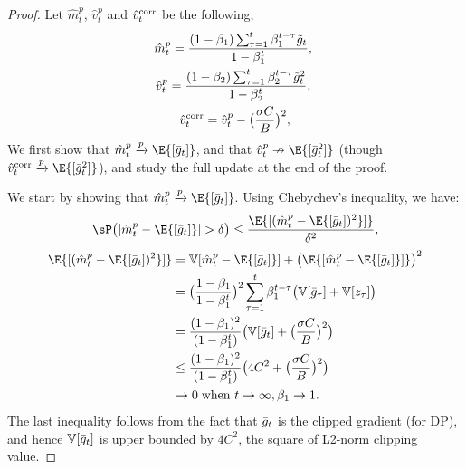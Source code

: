 \documentclass[letterpaper]{article} %
\def\V{\mathbb{V}}
\begin{document}
\begin{proof}
Let $\hat{m}_t^{p}$, $\hat{v}_t^{p}$ and $\hat{v}_t^{\textnormal{corr}}$ be the following,
\begin{gather*}
    \hat{m}_t^{p} = \frac{(1-\beta_1)\sum_{\tau=1}^{t}\beta_1^{t-\tau}\Tilde{g}_t}{1-\beta_1^t}, \; \\
    \hat{v}_t^{p} = \frac{(1-\beta_2)\sum_{\tau=1}^{t}\beta_2^{t-\tau}\Tilde{g}_t^2}{1-\beta_2^t}, \; \\%
    \hat{v}_t^{\textnormal{corr}} = \hat{v}_t^{p} - \big( \frac{\sigma C}{B} \big)^2,
\end{gather*}
We first show that $\hat{m}_t^{p} \xrightarrow{p} \E{[\Bar{g}_t]}$, and that $\hat{v}_t^{p} \nrightarrow \E{[\Bar{g}_t^2]}$ (though $\hat{v}_t^{\textnormal{corr}} \xrightarrow{p} \E{[\Bar{g}_t^2]}$), and study the full update at the end of the proof.

We start by showing that $\hat{m}_t^{p} \xrightarrow{p} \E{[\Bar{g}_t]}$. Using Chebychev's inequality, we have:
\begin{equation*}
    \sP\big( |\hat{m}_t^p - \E{[\Bar{g}_t]}| > \delta \big) \leq \frac{\E{[(\hat{m}_t^p - \E{[\Bar{g}_t])^2}]}}{\delta^2},
\end{equation*}
\begin{align*}
    \E{[(\hat{m}_t^p - \E{[\Bar{g}_t])^2}]} &= \V{[\hat{m}_t^p - \E{[\Bar{g}_t]}]} + \big(\E{[\hat{m}_t^p - \E{[\Bar{g}_t]}]}\big)^2 \\
    &= \big(\frac{1-\beta_1}{1-\beta_1^t}\big)^2 \sum_{\tau=1}^t \beta_1^{t-\tau} \big( \V{[\Bar{g}_\tau]} + \V{[z_\tau]} \big) \\
    &= \frac{(1-\beta_1)^2}{(1-\beta_1^t)} \big(\V{[\Bar{g}_t]} + \big(\frac{\sigma C}{B}\big)^2\big) \\
    &\leq \frac{(1-\beta_1)^2}{(1-\beta_1^t)} \big(4C^2 + \big(\frac{\sigma C}{B}\big)^2\big) \\
    &\rightarrow 0 \; \textnormal{when } t \rightarrow \infty, \beta_1 \rightarrow 1.
\end{align*}
The last inequality follows from the fact that $\Bar{g}_t$ is the clipped gradient (for DP), and hence $\V{[\Bar{g}_t]}$ is upper bounded by $4C^2$, the square of L2-norm clipping value.


\end{proof}
\end{document}
